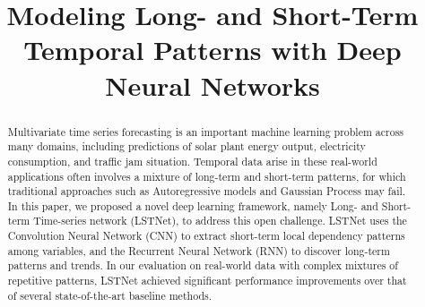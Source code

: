 \documentclass[sigconf]{acmart}
\begin{document}
\title{Modeling Long- and Short-Term Temporal Patterns with Deep Neural Networks}


\iffalse
\author{Guokun Lai}
\affiliation{%
  \institution{Carnegie Mellon University}
}
\email{guokun@cs.cmu.edu}

\author{Wei-Cheng Chang}
\affiliation{%
  \institution{Carnegie Mellon University}
}
\email{wchang2@andrew.cmu.edu}

\author{Yiming Yang}
\affiliation{%
  \institution{Carnegie Mellon University}
}
\email{yiming@cs.cmu.edu}

\author{Hanxiao Liu}
\affiliation{%
  \institution{Carnegie Mellon University}
}
\email{hanxiaol@cs.cmu.edu}

\fi
\begin{abstract}
Multivariate time series forecasting is an important machine learning problem across many domains, including predictions of solar plant energy output, electricity consumption, and traffic jam situation. Temporal data arise in these real-world applications often involves a mixture of long-term and short-term patterns, for which traditional approaches such as Autoregressive models and Gaussian Process may fail. In this paper, we proposed a novel deep learning framework, namely Long- and Short-term Time-series network (LSTNet), to address this open challenge. LSTNet uses the Convolution Neural Network (CNN) to extract short-term local dependency patterns among variables, and the Recurrent Neural Network (RNN) to discover long-term patterns and trends. In our evaluation on real-world data with complex mixtures of repetitive patterns, LSTNet achieved significant performance improvements over that of several state-of-the-art baseline methods.

\end{abstract}


\maketitle






%

%
%
\end{document}

